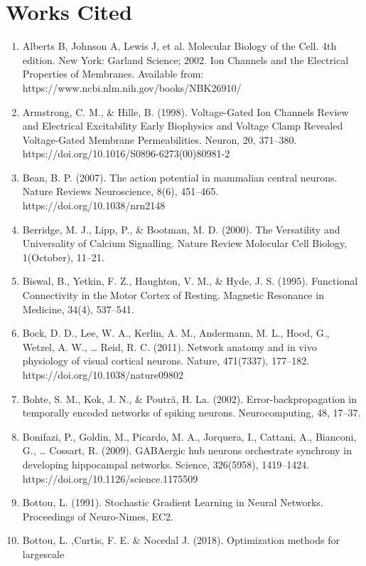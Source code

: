 \documentclass[11pt,titlepage]{article}
\begin{document}
\section{Works Cited}


\begin{spacing}{1}
\begin{enumerate}
\item Alberts B, Johnson A, Lewis J, et al. Molecular Biology of the Cell. 4th edition. New York: Garland Science; 2002. Ion Channels and the Electrical Properties of Membranes. Available from: https://www.ncbi.nlm.nih.gov/books/NBK26910/
\item Armstrong, C. M., \& Hille, B. (1998). Voltage-Gated Ion Channels Review and Electrical Excitability Early Biophysics and Voltage Clamp Revealed Voltage-Gated Membrane Permeabilities. Neuron, 20, 371–380.\\ https://doi.org/10.1016/S0896-6273(00)80981-2
\item Bean, B. P. (2007). The action potential in mammalian central neurons. Nature Reviews Neuroscience, 8(6), 451–465. https://doi.org/10.1038/nrn2148
\item Berridge, M. J., Lipp, P., \& Bootman, M. D. (2000). The Versatility and Universality of Calcium Signalling. Nature Review Molecular Cell Biology, 1(October), 11–21.
\item Biswal, B., Yetkin, F. Z., Haughton, V. M., \& Hyde, J. S. (1995). Functional Connectivity in the Motor Cortex of Resting. Magnetic Resonance in Medicine, 34(4), 537–541.
\item Bock, D. D., Lee, W. A., Kerlin, A. M., Andermann, M. L., Hood, G., Wetzel, A. W., … Reid, R. C. (2011). Network anatomy and in vivo physiology of visual cortical neurons. Nature, 471(7337), 177–182. https://doi.org/10.1038/nature09802
\item Bohte, S. M., Kok, J. N., \& Poutrã, H. La. (2002). Error-backpropagation in temporally encoded networks of spiking neurons. Neurocomputing, 48, 17–37.
\item Bonifazi, P., Goldin, M., Picardo, M. A., Jorquera, I., Cattani, A., Bianconi, G., … Cossart, R. (2009). GABAergic hub neurons orchestrate synchrony in developing hippocampal networks. Science, 326(5958), 1419–1424. https://doi.org/10.1126/science.1175509
\item Bottou, L. (1991). Stochastic Gradient Learning in Neural Networks. Proceedings of Neuro-Nimes, EC2.
\item Bottou, L. ,Curtis, F. E. \& Nocedal J. (2018). Optimization methods for largescale

\end{enumerate}
\end{spacing}
\end{document}

